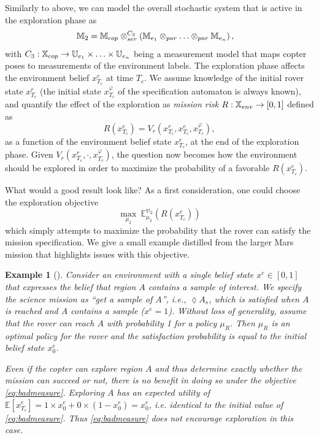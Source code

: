 \documentclass[conference]{IEEEtran}
\newtheorem{example}{Example}
\begin{document}
Similarly to above, we can model the overall stochastic system that is active in the exploration phase as
\begin{equation}
\begin{aligned}
	\mathbb{M}_2 & = \mathbb{M}_{cop} \otimes_{ser}^{C_3} \left( \mathbb{M}_{e_1} \otimes_{par} \ldots \otimes_{par} \mathbb{M}_{e_n} \right),
\end{aligned}
\end{equation}
with $C_3 : \mathbb{X}_{cop} \rightarrow \mathbb{U}_{e_1} \times \ldots \times \mathbb{U}_{e_n}$ being a measurement model that maps copter poses to measurements of the environment labels. The exploration phase affects the environment belief $x^e_{T_c}$ at time $T_c$. We assume knowledge of the initial rover state $x_{T_c}^r$ (the initial state $x_{T_c}^\varphi$ of the specification automaton is always known), and quantify the effect of the exploration as \emph{mission risk} $R:\mathbb{X}_{env}\rightarrow [0,1]$ defined as
\begin{equation}
	R(x_{T_c}^e) = V_r(x_{T_c}^r, x_{T_c}^e, x_{T_c}^\varphi),
\end{equation}
as a function of the environment belief state $x^e_{T_c}$, at the end of the exploration phase. Given $V_r(x_{T_c}^r, \cdot, x_{T_c}^\varphi)$, the question now becomes how the environment should be explored in order to maximize the probability of a favorable $R(x_{T_c}^e)$.

What would a good result look like? As a first consideration, one could choose the exploration objective
\begin{equation}
\label{eq:badmeasure}
	\max_{\mu_{2}}\  \mathbb E^{\mathbb M_{2}}_{\mu_2} (R(x_{T_c}^e) )
\end{equation}
which simply attempts to maximize the probability that the rover can satisfy the mission specification. We give a small example distilled from the larger Mars mission that highlights issues with this objective.

\begin{example}[]
	Consider an environment with a single belief state $x^e\in[0,1]$ that expresses the belief that region $A$ contains a sample of interest. We specify the science mission as ``\emph{get a sample of $A$}'', i.e.,  $\lozenge A_s$, which is satisfied when $A$ is reached and $A$ contains a sample ($x^e = 1$). Without loss of generality, assume that the rover can reach $A$ with probability 1 for a policy $\mu_R$. Then $\mu_R$ is an optimal policy for the rover and the satisfaction probability is equal to the initial belief state $x^e_{0}$.

	Even if the copter can explore region $A$ and thus determine exactly whether the mission can succeed or not, there is no benefit in doing so under the objective \eqref{eq:badmeasure}. Exploring $A$ has an expected utility of $\mathbb{E} \left[ x_{T_c}^e \right] = 1\times x^e_{0} +  0\times (1- x^e_{0}) = x^e_0$, i.e. identical to the initial value of \eqref{eq:badmeasure}. Thus \eqref{eq:badmeasure} does not encourage exploration in this case.
\end{example}
\end{document}
